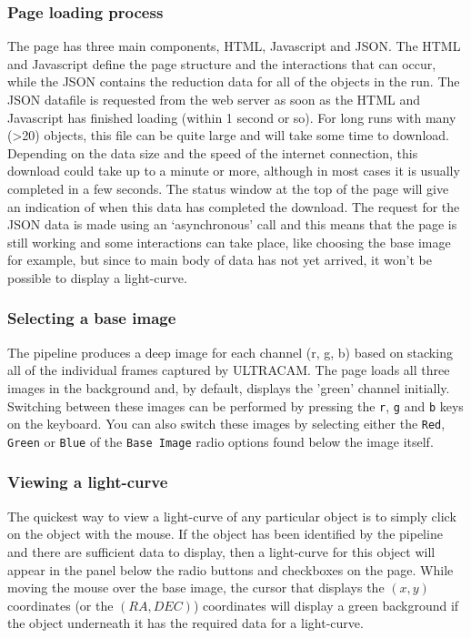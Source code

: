 \subsubsection{Page loading process}
The page has three main components, HTML, Javascript and JSON. The HTML and Javascript define the page structure and the interactions that can occur, while the JSON contains the reduction data for all of the objects in the run. The JSON datafile is requested from the web server as soon as the HTML and Javascript has finished loading (within 1 second or so). For long runs with many (\textgreater 20) objects, this file can be quite large and will take some time to download. Depending on the data size and the speed of the internet connection, this download could take up to a minute or more, although in most cases it is usually completed in a few seconds. The status window at the top of the page will give an indication of when this data has completed the download. The request for the JSON data is made using an `asynchronous' call and this means that the page is still working and some interactions can take place, like choosing the base image for example, but since to main body of data has not yet arrived, it won't be possible to display a light-curve.  

\subsubsection{Selecting a base image}
The pipeline produces a deep image for each channel (r, g, b) based on stacking all of the individual frames captured by ULTRACAM. The page loads all three images in the background and, by default, displays the 'green' channel initially. Switching between these images can be performed by pressing the \texttt{r}, \texttt{g} and \texttt{b} keys on the keyboard. You can also switch these images by selecting either the \texttt{Red},  \texttt{Green} or \texttt{Blue} of the \texttt{Base Image} radio options found below the image itself.

\subsubsection{Viewing a light-curve}
The quickest way to view a light-curve of any particular object is to simply click on the object with the mouse. If the object has been identified by the pipeline and there are sufficient data to display, then a light-curve for this object will appear in the panel below the radio buttons and checkboxes on the page. While moving the mouse over the base image, the cursor that displays the $(x, y)$ coordinates (or the $(RA, DEC)$) coordinates will display a green background if the object underneath it has the required data for a light-curve.

